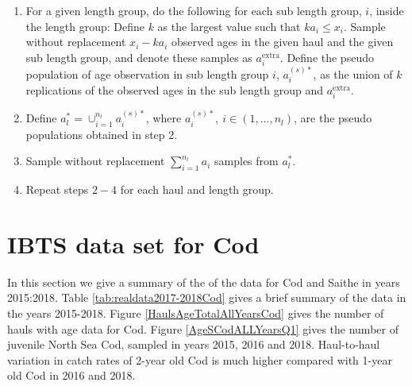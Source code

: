\documentclass[a4paper 12pt]{article}
\numberwithin{equation}{section}
\begin{document}
\begin{enumerate}
\item For a given length group, do the following for each sub length group, $i$, inside the length group: Define $k$ as the largest value such that $ka_{i} \leq x_{i}$. Sample without replacement $x_{i} - k a_{i}$ observed ages in the given haul and the given sub length group, and denote these samples as $a^{\mathrm{extra}}_{i}$. Define the pseudo population of age observation in sub length group $i$, $a^{(s)*}_{i}$, as the union of $k$ replications of the observed ages in the sub length group and $a^{\mathrm{extra}}_{i}$.

\item Define $a^{*}_{l} = \cup_{i = 1}^{n_{l}} a^{(s)*}_{i} $, where $a^{(s)*}_{i}, \ i \in \left(1,...,n_{l} \right)$, are the pseudo populations obtained in step 2.

\item Sample without replacement $\sum_{i = 1}^{n_{l}} a_{i}$ samples from $a^{*}_{l} $.

\item Repeat steps $2-4$ for each haul and length group.
\end{enumerate}



\clearpage
\section{\large IBTS data set for Cod}
\label{secAp:data}

In this section we give a summary of the of the data for Cod and Saithe in years 2015:2018. Table \ref{tab:realdata2017-2018Cod}  gives a brief summary of the data in the years 2015-2018. Figure \ref{HaulsAgeTotalAllYearsCod}  gives the number of hauls with age data for Cod.  Figure \ref{AgeSCodALLYearsQ1}  gives the  number of juvenile North Sea Cod, sampled in years 2015, 2016 and 2018. Haul-to-haul variation in catch rates of 2-year old Cod is much higher compared with 1-year old Cod in 2016 and 2018. \\

 
\end{document}
